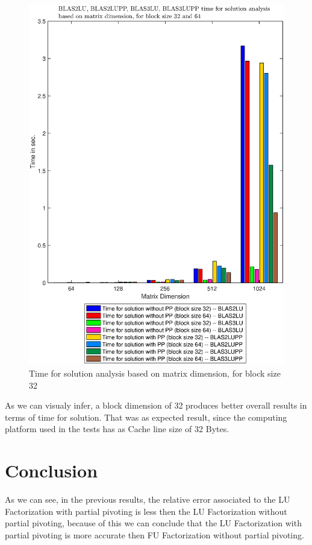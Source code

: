 \documentclass[conference,compsoc]{IEEEtran}
\begin{document}
  \begin{figure}[H]
     \centering
     \includegraphics[width=1.1\columnwidth]{time_32vs64.eps}
     \caption{Time for solution analysis based on matrix dimension, for block size 32}\label{graph:time_32vs64}
     \end{figure}
     
     As we can visualy infer, a block dimension of 32 produces better overall results in terms of time for solution. That was as expected result, since the computing platform used in the tests has as Cache line size of 32 Bytes.
  
\section{Conclusion}
As we can see, in the previous results, the relative error associated to the LU Factorization with partial pivoting is less then the LU Factorization without partial pivoting, because of this we can conclude that the LU Factorization with partial pivoting is more accurate then FU Factorization without partial pivoting.\par 
\end{document}
